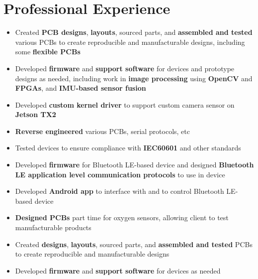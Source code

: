 \documentclass{my_resume}
\begin{document}
\section{Professional Experience}
\begin{flushleft}
  \begin{itemize}[noitemsep]
  \item Created \textbf{PCB designs}, \textbf{layouts}, sourced parts, and \textbf{assembled and tested} various PCBs to create reproducible and manufacturable designs, including some \textbf{flexible PCBs}
  \item Developed \textbf{firmware} and \textbf{support software} for devices and prototype designs as needed, including work in \textbf{image processing} using \textbf{OpenCV} and \textbf{FPGAs}, and \textbf{IMU-based sensor fusion}
  \item Developed \textbf{custom kernel driver} to support custom camera sensor on \textbf{Jetson TX2}
  \item \textbf{Reverse engineered} various PCBs, serial protocols, etc
  \item Tested devices to ensure compliance with \textbf{IEC60601} and other standards
\end{itemize}
\end{flushleft}
\begin{flushleft}
  \begin{itemize}[noitemsep]
  \item Developed \textbf{firmware} for Bluetooth LE-based device and designed \textbf{Bluetooth LE application level communication protocols} to use in device
  \item Developed \textbf{Android app} to interface with and to control Bluetooth LE-based device
\end{itemize}
\end{flushleft}
\begin{flushleft}
  \begin{itemize}[noitemsep]
  \item \textbf{Designed PCBs} part time for oxygen sensors, allowing client to test manufacturable products
  \item Created \textbf{designs}, \textbf{layouts}, sourced parts, and \textbf{assembled and tested} PCBs to create reproducible and manufacturable designs
  \item Developed \textbf{firmware} and \textbf{support software} for devices as needed
\end{itemize}
\end{flushleft}
\end{document}
